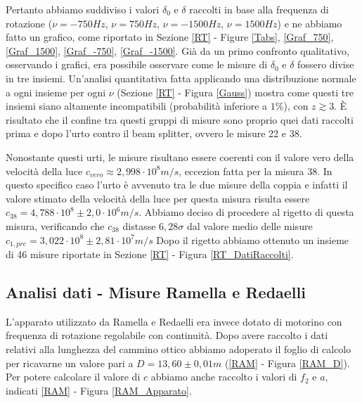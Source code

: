 \documentclass{article}
\begin{document}
\vspace{3mm}

Pertanto abbiamo suddiviso i valori $\delta_0$ e $\delta$ raccolti in base alla frequenza di rotazione ($\nu=-750Hz$, $\nu=750Hz$, 
$\nu=-1500Hz$, $\nu=1500Hz$) e ne abbiamo fatto un grafico, come riportato in Sezione \ref{RT} - Figure \ref{Tabs}, \ref{Graf_750}, \ref{Graf_1500}, \ref{Graf_-750}, 
\ref{Graf_-1500}. 
Già da un primo confronto qualitativo, osservando i grafici, era possibile osservare come le misure di $\delta_0$ e $\delta$ fossero divise in tre insiemi. Un'analisi 
quantitativa fatta applicando una distribuzione normale a ogni insieme per ogni $\nu$ (Sezione \ref{RT} - Figura \ref{Gauss}) mostra come questi tre insiemi siano altamente incompatibili
(probabilità inferiore a $1\%$), con $z\gtrsim 3$. 
È risultato che il confine tra questi gruppi di misure sono proprio quei dati raccolti prima e dopo l'urto contro il beam splitter, ovvero le misure 22 e 38.

\vspace{3mm}

Nonostante questi urti, le misure risultano essere coerenti con il valore vero della velocità della luce $c_{vero}\approx 2,998\cdot10^8 m/s$, eccezion fatta per la misura 38.
In questo specifico caso l'urto è avvenuto tra le due misure della coppia e infatti il valore stimato della velocità della luce per questa misura risulta essere $c_{38}=4,788\cdot10^8 \pm
2,0\cdot10^6 m/s$. Abbiamo deciso di procedere al rigetto di questa misura, verificando che $c_{38}$ distasse $6,28\sigma$ dal valore medio delle misure $c_{1,pre} = 3,022 \cdot 10^8 \pm 2,81 \cdot 10^7 m/s$
Dopo il rigetto abbiamo ottenuto un insieme di 46 misure riportate in Sezione \ref{RT} - Figura \ref{RT_DatiRaccolti}.

\vspace{3mm}


\subsection{Analisi dati - Misure Ramella e Redaelli}

L'apparato utilizzato da Ramella e Redaelli era invece dotato di motorino con frequenza di rotazione regolabile con continuità. Dopo avere raccolto i dati relativi alla 
lunghezza del cammino ottico abbiamo adoperato il foglio di calcolo per ricavarne un valore pari a $D = 13,60 \pm 0,01 m$ (\ref{RAM} - Figura \ref{RAM_D}). Per potere 
calcolare il valore di $c$ abbiamo anche raccolto i valori di $f_2$ e $a$, indicati \ref{RAM} - Figura \ref{RAM_Apparato}.
\end{document}
